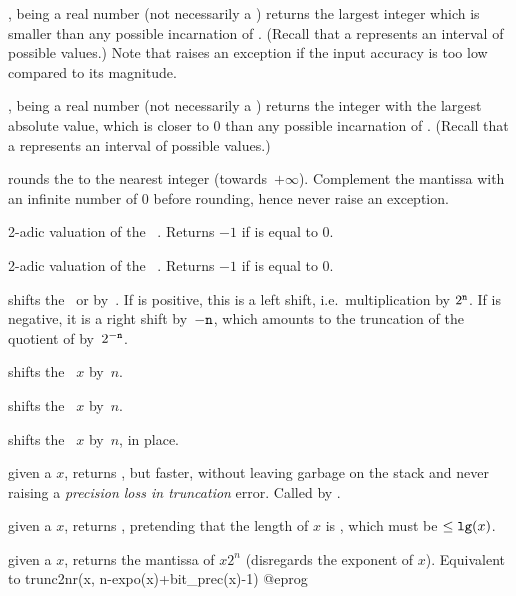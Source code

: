 ,  being a real number (not necessarily a
) returns the largest integer which is smaller than any possible
incarnation of . (Recall that a  represents an interval of
possible values.) Note that  raises an exception if the input
accuracy is too low compared to its magnitude.

,  being a real number (not necessarily a
) returns the integer with the largest absolute value, which is closer
to $0$ than any possible incarnation of . (Recall that a 
represents an interval of possible values.)

 rounds the   to the nearest
integer (towards~$+\infty$). Complement the mantissa with an infinite number
of $0$ before rounding, hence never raise an exception.


 2-adic valuation of the ~. Returns
$-1$ if  is equal to 0.

 2-adic valuation of the ~. Returns $-1$
if  is equal to 0.

 shifts the~ or
  by~. If  is positive, this is a left shift,
i.e.~multiplication by $2^{{\tt n}}$. If  is negative, it is a right
shift by~$-{\tt n}$, which amounts to the truncation of the quotient of 
by~$2^{-{\tt n}}$.

 shifts the ~$x$ by~$n$.

 shifts the ~$x$ by~$n$.

 shifts the ~$x$ by~$n$,
in place.

 given a  $x$, returns
, but faster, without leaving garbage on the stack
and never raising a \emph{precision loss in truncation} error.
Called by .

 given a  $x$, returns
, pretending that the length of $x$ is , which
must be $\leq {\tt lg}(x)$.

 given a  $x$, returns
the mantissa of $x 2^n$ (disregards the exponent of $x$). Equivalent to
\bprog
  trunc2nr(x, n-expo(x)+bit_prec(x)-1)
@eprog

